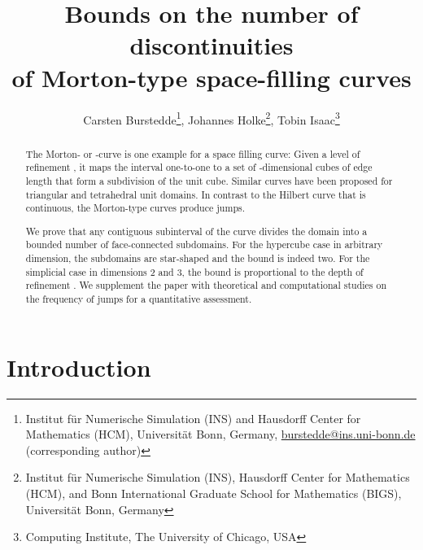\documentclass[a4paper,11pt]{article}
\author{Carsten Burstedde\footnote{Institut f\"ur Numerische Simulation (INS)
          and Hausdorff Center for Mathematics (HCM),
          Universit\"at Bonn, Germany,
          \href{mailto:burstedde@ins.uni-bonn.de}{burstedde@ins.uni-bonn.de}
          (corresponding author)},
        Johannes Holke\footnote{Institut f\"ur Numerische Simulation (INS),
          Hausdorff Center for Mathematics (HCM),
          and Bonn International Graduate School for Mathematics (BIGS),
          Universit\"at Bonn, Germany},
        Tobin Isaac\footnote{Computing Institute, The University of Chicago, USA}
      }
\title{Bounds on the number of discontinuities\\
       of Morton-type space-filling curves}
\newcommand{\seclab}[1]{\label{sec:#1}}
\begin{document}
\maketitle

\begin{abstract}
The Morton- or -curve is one example for a space filling curve: Given a
level of refinement , it maps the interval 
one-to-one to a set of -dimensional cubes of edge length  that form
a
subdivision of the unit cube.
Similar curves have been proposed for triangular and tetrahedral unit domains.
In contrast to the Hilbert curve that is continuous, the Morton-type curves
produce jumps.

We prove that any contiguous subinterval of the curve divides the domain into a
bounded number of face-connected subdomains.
For the hypercube case in arbitrary dimension, the subdomains are star-shaped
and the bound is indeed two.
For the simplicial case in dimensions 2 and 3, the bound is proportional to the
depth of refinement .
We supplement the paper with theoretical and computational studies on the
frequency of jumps for a quantitative assessment.
\end{abstract}

\section{Introduction}
\seclab{intro}
\end{document}
